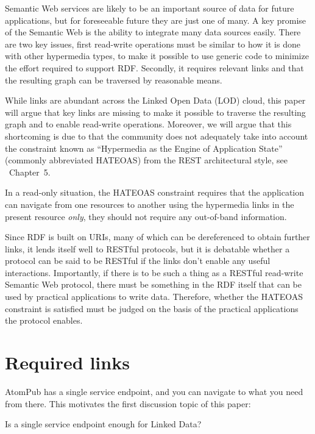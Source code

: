 \documentclass{llncs}
\begin{document}
Semantic Web services are likely to be an important source of data for
future applications, but for foreseeable future they are just one of many. A
key promise of the Semantic Web is the ability to integrate many data
sources easily. There are two key issues, first read-write operations
must be similar to how it is done with other hypermedia types, to make
it possible to use generic code to minimize the effort required to
support RDF. Secondly, it requires relevant links and that the
resulting graph can be traversed by reasonable means.

While links are abundant across the Linked Open Data (LOD) cloud, this paper will
argue that key links are missing to make it possible to traverse the
resulting graph and to enable read-write operations. Moreover, we will
argue that this shortcoming is due to that the community does not
adequately take into account the constraint known as ``Hypermedia as
the Engine of Application State'' (commonly abbreviated HATEOAS) from
the REST architectural style, see
\cite{Fielding_2000_Architectural-Styles}~Chapter~5.

In a read-only situation, the HATEOAS constraint requires that the
application can navigate from one resources to another using the
hypermedia links in the present resource \emph{only}, they should not
require any out-of-band information.

Since RDF is built on URIs, many of which can be dereferenced to
obtain further links, it lends itself well to RESTful protocols, but
it is debatable whether a protocol can be said to be RESTful if the
links don't enable any useful interactions. Importantly, if there is
to be such a thing as a RESTful read-write Semantic Web protocol,
there must be something in the RDF itself that can be used by
practical applications to write data. Therefore, whether the HATEOAS
constraint is satisfied must be judged on the basis of the practical
applications the protocol enables.

\section{Required links}

AtomPub has a single service endpoint,
and you can navigate to what you need from there. This motivates the
first discussion topic of this paper:

\begin{question}
Is a single service endpoint enough for Linked Data?
\end{question}
\end{document}
